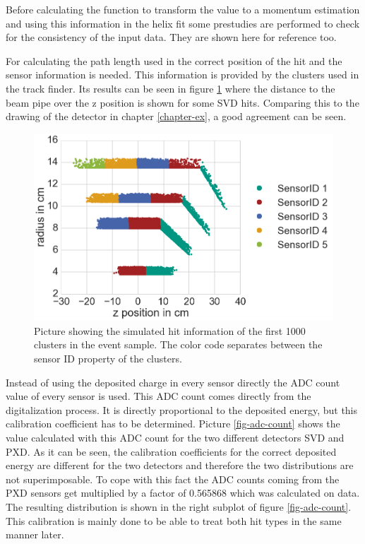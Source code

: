 Before calculating the function to transform the \dedx value to a momentum estimation and using this information in the helix fit some prestudies are performed to check for the consistency of the input data. They are shown here for reference too.

For calculating the path length used in \dedx the correct position of the hit and the sensor information is needed. This information is provided by the clusters used in the track finder. Its results can be seen in figure \ref{fig-cluster-position} where the distance to the beam pipe over the z position is shown for some SVD hits. Comparing this to the drawing of the detector in chapter \ref{chapter-ex}, a good agreement can be seen.

\begin{figure}
 \centering
 \includegraphics[width=0.8\linewidth]{figures/vxd/cluster_positions.png}
 \caption[Picture showing the simulated hit information.]{Picture showing the simulated hit information of the first 1000 clusters in the event sample. The color code separates between the sensor ID property of the clusters.}
 \label{fig-cluster-position}
\end{figure}

Instead of using the deposited charge in every sensor directly the ADC count value of every sensor is used. This ADC count comes directly from the digitalization process. It is directly proportional to the deposited energy, but this calibration coefficient has to be determined. %
Picture \ref{fig-adc-count} shows the \dedx value calculated with this ADC count for the two different detectors SVD and PXD. As it can be seen, the calibration coefficients for the correct deposited energy are different for the two detectors and therefore the two distributions are not superimposable. To cope with this fact the ADC counts coming from the PXD sensors get multiplied by a factor of 0.565868 which was calculated on data. The resulting distribution is shown in the right subplot of figure \ref{fig-adc-count}. This calibration is mainly done to be able to treat both hit types in the same manner later. 

